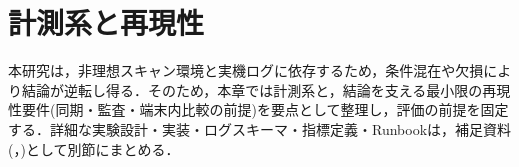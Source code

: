 ﻿%
\chapter{計測系と再現性}
\label{ch:measurement_repro}
\clearpage

本研究は，非理想スキャン環境と実機ログに依存するため，条件混在や欠損により結論が逆転し得る．そのため，本章では計測系と，結論を支える最小限の再現性要件(同期・監査・端末内比較の前提)を要点として整理し，評価の前提を固定する．詳細な実験設計・実装・ログスキーマ・指標定義・Runbookは，補足資料(，)として別節にまとめる．





